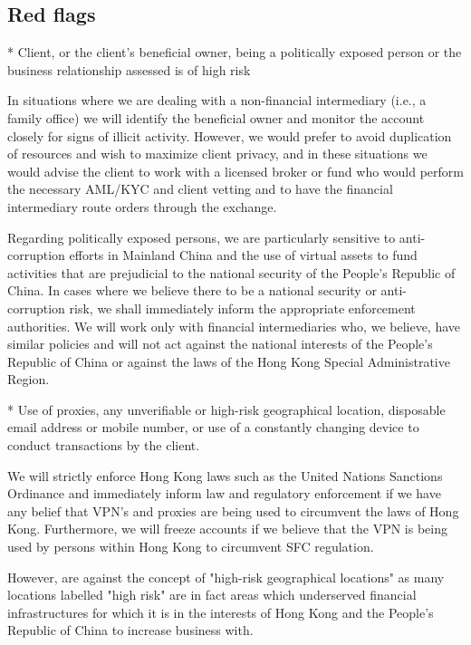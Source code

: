 
\subsection{Red flags}

* Client, or the client’s beneficial owner, being a politically exposed person or the business relationship assessed is of high risk

In situations where we are dealing with a non-financial intermediary
(i.e., a family office) we will identify the beneficial owner and
monitor the account closely for signs of illicit activity.  However,
we would prefer to avoid duplication of resources and wish to maximize
client privacy, and in these situations we would advise the client to
work with a licensed broker or fund who would perform the necessary
AML/KYC and client vetting and to have the financial intermediary
route orders through the exchange.

Regarding politically exposed persons, we are particularly
sensitive to anti-corruption efforts in Mainland China and the use of
virtual assets to fund activities that are prejudicial to the
national security of the People's Republic of China.  In cases where
we believe there to be a national security or anti-corruption risk, we
shall immediately inform the appropriate enforcement authorities.  We
will work only with financial intermediaries who, we believe, have
similar policies and will not act against the national interests of
the People's Republic of China or against the laws of the Hong Kong
Special Administrative Region.

* Use of proxies, any unverifiable or high-risk geographical location,
disposable email address or mobile number, or use of a constantly
changing device to conduct transactions by the client.

We will strictly enforce Hong Kong laws such as the United Nations
Sanctions Ordinance and immediately inform law and regulatory
enforcement if we have any belief that VPN's and proxies are being
used to circumvent the laws of Hong Kong.  Furthermore, we will freeze
accounts if we believe that the VPN is being used by persons within
Hong Kong to circumvent SFC regulation.

However, are against the concept of "high-risk geographical
locations" as many locations labelled "high risk" are in fact areas
which underserved financial infrastructures for which it is in the
interests of Hong Kong and the People's Republic of China to increase
business with.

